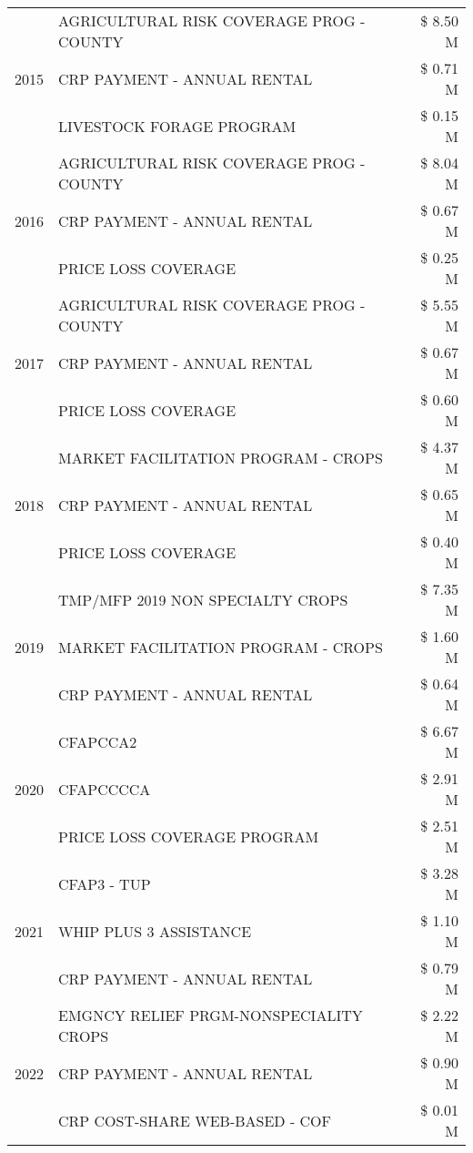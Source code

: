 \begin{tabular}{llr}
\cline{1-3}
\multirow[t]{3}{*}{2015} & AGRICULTURAL RISK COVERAGE PROG - COUNTY & \$ 8.50 M \\
 & CRP PAYMENT - ANNUAL RENTAL & \$ 0.71 M \\
 & LIVESTOCK FORAGE PROGRAM & \$ 0.15 M \\
\cline{1-3}
\multirow[t]{3}{*}{2016} & AGRICULTURAL RISK COVERAGE PROG - COUNTY & \$ 8.04 M \\
 & CRP PAYMENT - ANNUAL RENTAL & \$ 0.67 M \\
 & PRICE LOSS COVERAGE & \$ 0.25 M \\
\cline{1-3}
\multirow[t]{3}{*}{2017} & AGRICULTURAL RISK COVERAGE PROG - COUNTY & \$ 5.55 M \\
 & CRP PAYMENT - ANNUAL RENTAL & \$ 0.67 M \\
 & PRICE LOSS COVERAGE & \$ 0.60 M \\
\cline{1-3}
\multirow[t]{3}{*}{2018} & MARKET FACILITATION PROGRAM - CROPS & \$ 4.37 M \\
 & CRP PAYMENT - ANNUAL RENTAL & \$ 0.65 M \\
 & PRICE LOSS COVERAGE & \$ 0.40 M \\
\cline{1-3}
\multirow[t]{3}{*}{2019} & TMP/MFP 2019 NON SPECIALTY CROPS & \$ 7.35 M \\
 & MARKET FACILITATION PROGRAM - CROPS & \$ 1.60 M \\
 & CRP PAYMENT - ANNUAL RENTAL & \$ 0.64 M \\
\cline{1-3}
\multirow[t]{3}{*}{2020} & CFAPCCA2 & \$ 6.67 M \\
 & CFAPCCCCA & \$ 2.91 M \\
 & PRICE LOSS COVERAGE PROGRAM & \$ 2.51 M \\
\cline{1-3}
\multirow[t]{3}{*}{2021} & CFAP3 - TUP & \$ 3.28 M \\
 & WHIP PLUS 3 ASSISTANCE & \$ 1.10 M \\
 & CRP PAYMENT - ANNUAL RENTAL & \$ 0.79 M \\
\cline{1-3}
\multirow[t]{3}{*}{2022} & EMGNCY RELIEF PRGM-NONSPECIALITY CROPS & \$ 2.22 M \\
 & CRP PAYMENT - ANNUAL RENTAL & \$ 0.90 M \\
 & CRP COST-SHARE WEB-BASED - COF & \$ 0.01 M \\
\cline{1-3}
\bottomrule
\end{tabular}
